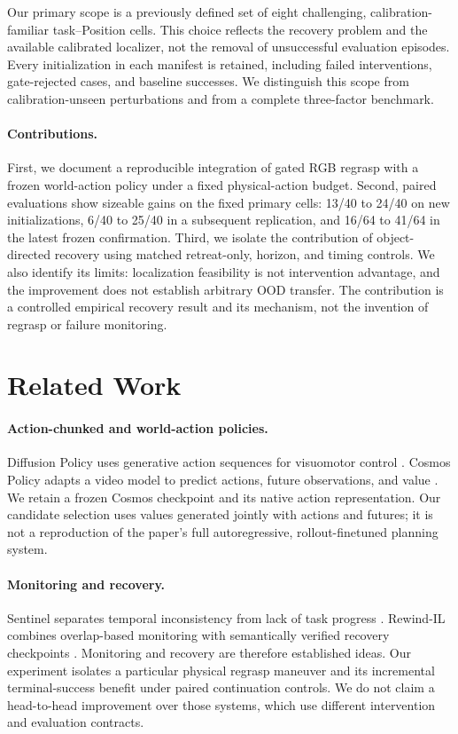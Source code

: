 \documentclass{article}
\begin{document}
Our primary scope is a previously defined set of eight challenging,
calibration-familiar task--Position cells. This choice reflects the recovery
problem and the available calibrated localizer, not the removal of unsuccessful
evaluation episodes. Every initialization in each manifest is retained,
including failed interventions, gate-rejected cases, and baseline successes.
We distinguish this scope from calibration-unseen perturbations and from a
complete three-factor benchmark.

\paragraph{Contributions.}
First, we document a reproducible integration of gated RGB regrasp with a frozen
world-action policy under a fixed physical-action budget.
Second, paired evaluations show sizeable gains on the fixed primary cells:
13/40 to 24/40 on new initializations, 6/40 to 25/40 in a subsequent replication,
and 16/64 to 41/64 in the latest frozen confirmation.
Third, we isolate the contribution of object-directed recovery using matched
retreat-only, horizon, and timing controls. We also identify its limits:
localization feasibility is not intervention advantage, and the improvement
does not establish arbitrary OOD transfer.
The contribution is a controlled empirical recovery result and its mechanism,
not the invention of regrasp or failure monitoring.

\section{Related Work}
\paragraph{Action-chunked and world-action policies.}
Diffusion Policy uses generative action sequences for visuomotor control
\citep{diffusion_policy}. Cosmos Policy adapts a video model to predict
actions, future observations, and value \citep{cosmos_policy}.
We retain a frozen Cosmos checkpoint and its native action representation.
Our candidate selection uses values generated jointly with actions and futures;
it is not a reproduction of the paper's full autoregressive,
rollout-finetuned planning system.

\paragraph{Monitoring and recovery.}
Sentinel separates temporal inconsistency from lack of task progress
\citep{sentinel}. Rewind-IL combines overlap-based monitoring with
semantically verified recovery checkpoints \citep{rewind_il}.
Monitoring and recovery are therefore established ideas.
Our experiment isolates a particular physical regrasp maneuver and its
incremental terminal-success benefit under paired continuation controls.
We do not claim a head-to-head improvement over those systems, which use
different intervention and evaluation contracts.
\end{document}
